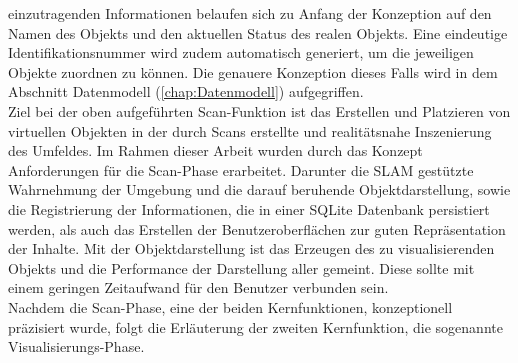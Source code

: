 einzutragenden Informationen belaufen sich zu Anfang der %
Konzeption auf den Namen des Objekts %
und den aktuellen Status des realen Objekts. Eine eindeutige Identifikationsnummer wird zudem automatisch generiert, 
um die jeweiligen Objekte zuordnen zu können. 
Die genauere Konzeption dieses Falls wird in dem Abschnitt Datenmodell (\ref{chap:Datenmodell}) aufgegriffen. 
\\ 
Ziel bei der oben aufgeführten Scan-Funktion ist das Erstellen und Platzieren von virtuellen Objekten in der durch Scans erstellte und 
realitätsnahe Inszenierung des Umfeldes. Im Rahmen dieser Arbeit wurden durch das Konzept Anforderungen für die Scan-Phase erarbeitet. 
Darunter die \acs{SLAM} gestützte Wahrnehmung der Umgebung und die darauf beruhende Objektdarstellung, sowie die Registrierung der Informationen, die in 
einer SQLite Datenbank persistiert werden, als auch das Erstellen der Benutzeroberflächen zur guten Repräsentation der Inhalte. Mit der Objektdarstellung 
ist das Erzeugen des zu visualisierenden Objekts und die Performance der Darstellung aller gemeint. Diese sollte mit einem geringen Zeitaufwand für den 
Benutzer verbunden sein.
\\ 
\linebreak
Nachdem die Scan-Phase, eine der beiden Kernfunktionen, konzeptionell präzisiert wurde, folgt die Erläuterung der zweiten Kernfunktion, 
die sogenannte Visualisierungs-Phase. 

